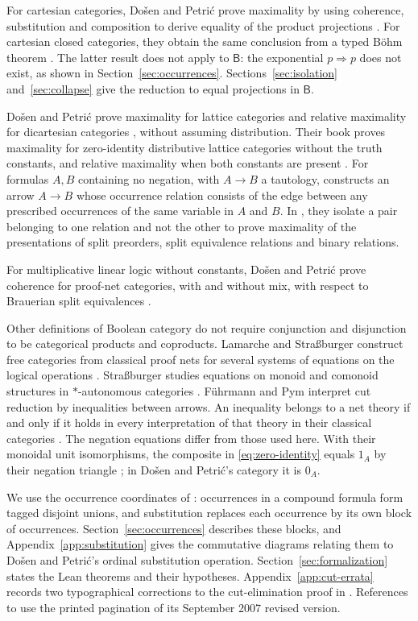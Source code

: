 \documentclass[11pt]{article}
\newcommand{\B}{\mathsf B}
\begin{document}
For cartesian categories, Do\v{s}en and Petri\'c prove maximality by
using coherence, substitution and composition to derive equality of
the product projections \cite[\S5]{DPCartesian}.
For cartesian closed categories, they obtain the same conclusion
from a typed B\"ohm theorem \cite[\S11]{DPCCC}.
The latter result does not apply to $\B$: the exponential
$p\Rightarrow p$ does not exist, as shown in
Section~\ref{sec:occurrences}. Sections~\ref{sec:isolation}
and~\ref{sec:collapse} give the reduction to equal projections in $\B$.

Do\v{s}en and Petri\'c prove maximality for lattice categories
and relative maximality for dicartesian categories
\cite[\S\S8--10]{DPBicartesian}, without assuming distribution.
Their book proves maximality for zero-identity distributive lattice
categories without the truth constants, and relative maximality
when both constants are present \cite[\S12.5, p.~292]{DP}.
For formulas $A,B$ containing no negation, with $A\to B$ a
tautology, \cite[Lemma~6]{DPIsomorphic} constructs an arrow
$A\to B$ whose occurrence relation consists of the edge between
any prescribed occurrences of the same variable in $A$ and $B$.
In \cite[\S16]{DPSplit}, they isolate a pair belonging to one relation
and not the other to prove maximality of the presentations of split
preorders, split equivalence relations and binary relations.

For multiplicative linear logic without constants, Do\v{s}en and
Petri\'c prove coherence for proof-net categories, with and without
mix, with respect to Brauerian split equivalences \cite{DPPN}.

Other definitions of Boolean category do not require conjunction and
disjunction to be categorical products and coproducts. Lamarche and Stra{\ss}burger
construct free categories from classical proof nets for several
systems of equations on the logical operations \cite[Theorem~3.5.4]{LSFree}.
Stra{\ss}burger studies equations on monoid and comonoid structures
in $*$-autonomous categories \cite{Strassburger}.
F\"uhrmann and Pym interpret cut reduction by inequalities between
arrows. An inequality belongs to a net theory if and only if it
holds in every interpretation of that theory in their classical
categories \cite[Theorems~6.4--6.5]{FP}.
The negation equations differ from those used here.
With their monoidal unit isomorphisms, the composite in
\eqref{eq:zero-identity} equals $1_A$ by their negation triangle
\cite[(11)]{FP}; in Do\v{s}en and Petri\'c's category it is $0_A$.

We use the occurrence coordinates of \cite[\S9]{Notation}: occurrences
in a compound formula form tagged disjoint unions, and substitution
replaces each occurrence by its own block of occurrences.
Section~\ref{sec:occurrences} describes these blocks, and
Appendix~\ref{app:substitution} gives the commutative diagrams relating
them to Do\v{s}en and Petri\'c's ordinal substitution operation.
Section~\ref{sec:formalization} states the Lean theorems and their
hypotheses.
Appendix~\ref{app:cut-errata} records two typographical corrections to the
cut-elimination proof in \cite{DP}.
References to \cite{DP} use the printed
pagination of its September 2007 revised version.
\end{document}
